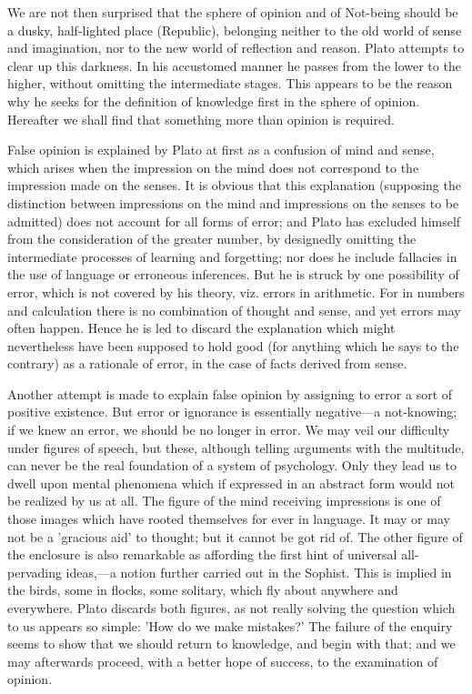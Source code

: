 \documentclass[11pt,letter]{article}
\begin{document}
\par  We are not then surprised that the sphere of opinion and of Not-being should be a dusky, half-lighted place (Republic), belonging neither to the old world of sense and imagination, nor to the new world of reflection and reason. Plato attempts to clear up this darkness. In his accustomed manner he passes from the lower to the higher, without omitting the intermediate stages. This appears to be the reason why he seeks for the definition of knowledge first in the sphere of opinion. Hereafter we shall find that something more than opinion is required.

\par  False opinion is explained by Plato at first as a confusion of mind and sense, which arises when the impression on the mind does not correspond to the impression made on the senses. It is obvious that this explanation (supposing the distinction between impressions on the mind and impressions on the senses to be admitted) does not account for all forms of error; and Plato has excluded himself from the consideration of the greater number, by designedly omitting the intermediate processes of learning and forgetting; nor does he include fallacies in the use of language or erroneous inferences. But he is struck by one possibility of error, which is not covered by his theory, viz. errors in arithmetic. For in numbers and calculation there is no combination of thought and sense, and yet errors may often happen. Hence he is led to discard the explanation which might nevertheless have been supposed to hold good (for anything which he says to the contrary) as a rationale of error, in the case of facts derived from sense.

\par  Another attempt is made to explain false opinion by assigning to error a sort of positive existence. But error or ignorance is essentially negative—a not-knowing; if we knew an error, we should be no longer in error. We may veil our difficulty under figures of speech, but these, although telling arguments with the multitude, can never be the real foundation of a system of psychology. Only they lead us to dwell upon mental phenomena which if expressed in an abstract form would not be realized by us at all. The figure of the mind receiving impressions is one of those images which have rooted themselves for ever in language. It may or may not be a 'gracious aid' to thought; but it cannot be got rid of. The other figure of the enclosure is also remarkable as affording the first hint of universal all-pervading ideas,—a notion further carried out in the Sophist. This is implied in the birds, some in flocks, some solitary, which fly about anywhere and everywhere. Plato discards both figures, as not really solving the question which to us appears so simple: 'How do we make mistakes?' The failure of the enquiry seems to show that we should return to knowledge, and begin with that; and we may afterwards proceed, with a better hope of success, to the examination of opinion.
\end{document}
